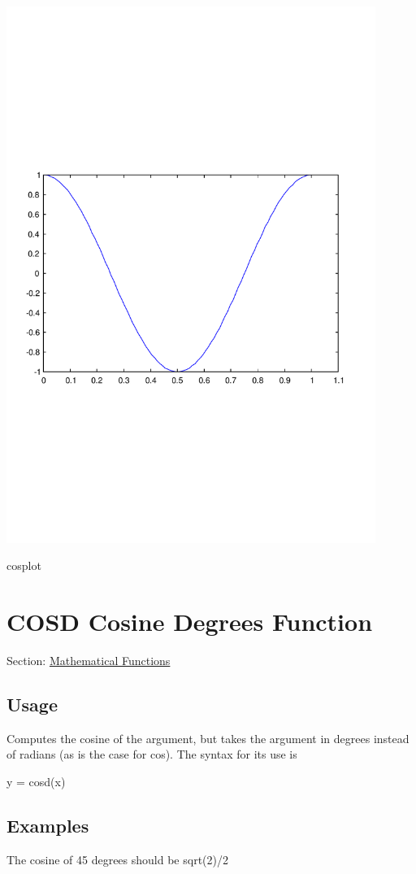 
\begin{DoxyImage}
\includegraphics[width=12cm]{cosplot}
\caption{cosplot}
\end{DoxyImage}
 \hypertarget{mathfunctions_cosd}{}\section{C\-O\-S\-D Cosine Degrees Function}\label{mathfunctions_cosd}
Section\-: \hyperlink{sec_mathfunctions}{Mathematical Functions} \hypertarget{vtkwidgets_vtkxyplotwidget_Usage}{}\subsection{Usage}\label{vtkwidgets_vtkxyplotwidget_Usage}
Computes the cosine of the argument, but takes the argument in degrees instead of radians (as is the case for {\ttfamily cos}). The syntax for its use is \begin{DoxyVerb}   y = cosd(x)
\end{DoxyVerb}
 \hypertarget{variables_matrix_Examples}{}\subsection{Examples}\label{variables_matrix_Examples}
The cosine of 45 degrees should be {\ttfamily sqrt(2)/2}


